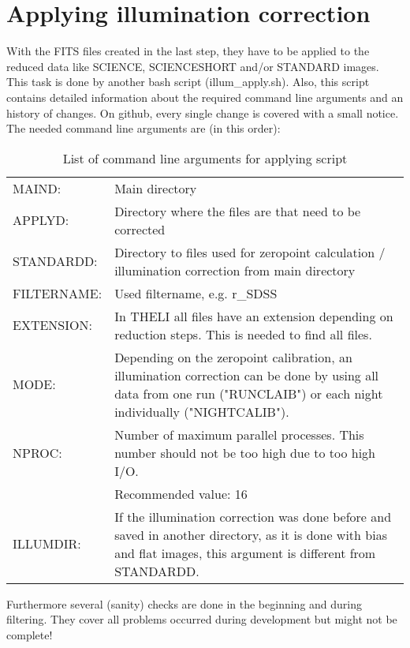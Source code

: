 \chapter{Applying illumination correction}
\label{ch:ApplyingIlluminationCorrection}
With the FITS files created in the last step, they have to be applied to the reduced data like SCIENCE, SCIENCESHORT and/or STANDARD images. This task is done by another bash script (illum\_apply.sh). Also, this script contains detailed information about the required command line arguments and an history of changes. On github, every single change is covered with a small notice. The needed command line arguments are (in this order):
\begin{table}[H]
\centering
\begin{tabular}{lp{11.5cm}}
MAIND: & Main directory\\
APPLYD: & Directory where the files are that need to be corrected\\
STANDARDD: & Directory to files used for zeropoint calculation / illumination correction from main directory\\
FILTERNAME: & Used filtername, e.g. r\_SDSS\\
EXTENSION: & In \textrm{THELI} all files have an extension depending on reduction steps. This is needed to find all files.\\
MODE: & Depending on the zeropoint calibration, an illumination correction can be done by using all data from one run ("RUNCLAIB") or each night individually ("NIGHTCALIB").\\
NPROC: & Number of maximum parallel processes. This number should not be too high due to too high I/O.\\
 & Recommended value: 16\\
ILLUMDIR: & If the illumination correction was done before and saved in another directory, as it is done with bias and flat images, this argument is different from STANDARDD.
\end{tabular}
\caption{List of command line arguments for applying script}
\label{tab:CommandLineArgumentsApplyingScript}
\end{table}
Furthermore several (sanity) checks are done in the beginning and during filtering. They cover all problems occurred during development but might not be complete!
